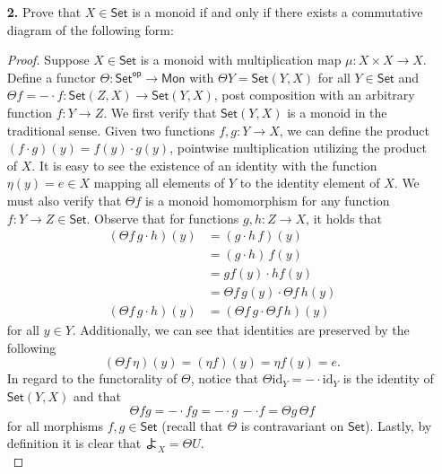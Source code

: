 \documentclass[ 12pt ]{article}
\begin{document}
\begin{enumerate}
	\item[\textbf{2.}] Prove that $X \in \mathsf{Set}$ is a monoid if and only if there exists a commutative diagram of the following form:
	\begin{center}
	\end{center}

		\begin{proof}
			Suppose $X \in \mathsf{Set}$ is a monoid with multiplication map $\mu : X \times X \to X$. Define a functor $\Theta : \mathsf{Set}^\mathsf{op} \to \mathsf{Mon}$ with $\Theta Y = \mathsf{Set}(Y, X)$ for all $Y \in \mathsf{Set}$ and $\Theta f = - \cdot f : \mathsf{Set}(Z, X) \to \mathsf{Set}(Y, X)$, post composition with an arbitrary function $f : Y \to Z$. We first verify that $\mathsf{Set}(Y, X)$ is a monoid in the traditional sense. Given two functions $f, g : Y \to X$, we can define the product $(f \cdot g)(y) = f(y) \cdot g(y)$, pointwise multiplication utilizing the product of $X$. It is easy to see the existence of an identity with the function $\eta(y) = e \in X$ mapping all elements of $Y$ to the identity element of $X$. We must also verify that $\Theta f$ is a monoid homomorphism for any function $f : Y \to Z \in \mathsf{Set}$. Observe that for functions $g, h : Z \to X$, it holds that
			\begin{align*}
				(\Theta f\, g \cdot h)(y) &= (g \cdot h\, f)(y) \\
				&= (g \cdot h)\, f(y) \\
				&= gf(y) \cdot hf(y) \\
				&= \Theta f\, g(y) \cdot \Theta f\, h(y) \\
				(\Theta f\, g \cdot h)(y) &= (\Theta f\, g \cdot \Theta f\, h)(y)
			\end{align*}
			for all $y \in Y$. Additionally, we can see that identities are preserved by the following $$(\Theta f\, \eta)(y) = (\eta f)(y) = \eta f(y) = e.$$ In regard to the functorality of $\Theta$, notice that $\Theta \mathrm{id}_Y = - \cdot \mathrm{id}_Y$ is the identity of $\mathsf{Set}(Y, X)$ and that $$\Theta fg = - \cdot fg = - \cdot g\, - \cdot f = \Theta g\, \Theta f$$ for all morphisms $f, g \in \mathsf{Set}$ (recall that $\Theta$ is contravariant on $\mathsf{Set}$). Lastly, by definition it is clear that $よ_X = \Theta U$. \\


\end{proof}
\end{enumerate}
\end{document}
